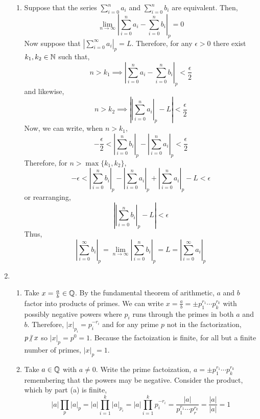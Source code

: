 \documentclass[12pt]{extarticle}
\begin{document}
\begin{enumerate}
\begin{enumerate}
\item Suppose that the series $\sum\limits_{i = 0}^n a_i$ and $\sum\limits_{i = 0}^n b_i$ are equivalent. Then,
\[ \lim\limits_{n \to \infty} \left| \sum\limits_{i = 0}^n a_i - \sum\limits_{i = 0}^n b_i \right|_p = 0 \]
Now suppose that $\left| \sum\limits_{i = 0}^\infty a_i \right|_p = L$. Therefore, for any $\epsilon > 0$ there exist $k_1, k_2 \in \mathbb{N}$ such that, 
\[n > k_1 \implies \left| \sum\limits_{i = 0}^n a_i - \sum\limits_{i = 0}^n b_i \right|_p  < \frac{\epsilon}{2}\]
and likewise, 
\[n > k_2 \implies \left| \left| \sum\limits_{i = 0}^n a_i \right|_p - L \right| < \frac{\epsilon}{2}\]  
Now, we can write, when $n > k_1$, 
\[   - \frac{\epsilon}{2} < \left| \sum\limits_{i = 0}^n b_i \right|_p - \left| \sum\limits_{i = 0}^n a_i \right|_p <  \frac{\epsilon}{2} \]
Therefore, for $n > \max\{k_1, k_2\}$,
\[   - \epsilon < \left| \sum\limits_{i = 0}^n b_i \right|_p - \left| \sum\limits_{i = 0}^n a_i \right|_p + \left| \sum\limits_{i = 0}^n a_i \right|_p - L <  \epsilon \]
or rearranging,
\[ \left| \left| \sum\limits_{i = 0}^n b_i \right|_p - L \right| < \epsilon \]  
Thus,
\[ \left| \sum\limits_{i = 0}^\infty b_i \right|_p = \lim\limits_{n \to \infty} \left| \sum\limits_{i = 0}^n b_i \right|_p = L =  \left| \sum\limits_{i = 0}^\infty a_i \right|_p\]
\end{enumerate}

\item

\begin{enumerate}
\item Take $x = \frac{a}{b} \in \mathbb{Q}$. By the fundamental theorem of arithmetic, $a$ and $b$ factor into products of primes. We can write $x = \frac{a}{b} = \pm p_1^{r_1} \cdots p_k^{r_k}$ with possibly negative powers where $p_i$ runs through the primes in both $a$ and $b$. Therefore, $|x|_{p_i} = p_i^{-r_i}$ and for any prime $p$ not in the factorization, $p \ndivides x$ so $|x|_p = p^0 = 1$. Because the factoization is finite, for all but a finite number of primes, $|x|_p = 1$. 

\item Take $a \in \mathbb{Q}$ with $a \neq 0$. Write the prime factoization, $a = \pm p_1^{r_1} \cdots p_k^{r_k}$ remembering that the powers may be negative. Consider the product, which by part (a) is finite,
\[ |a| \prod_{p} |a|_p = |a| \prod_{i = 1}^k |a|_{p_i} = |a| \prod_{i = 1}^k p_i^{-r_i} = \frac{|a|}{p_1^{r_1} \cdots p_r^{r_k}} = \frac{|a|}{|a|} = 1 \] 
\end{enumerate}


\end{enumerate}
\end{document}

